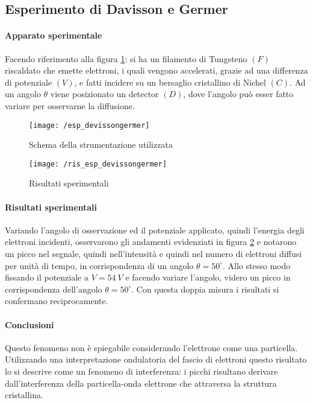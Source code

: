 \subsection{Esperimento di Davisson e Germer}
\paragraph{Apparato sperimentale} 
Facendo riferimento alla figura \ref{app_spe}: si ha un filamento di Tungsteno $(F)$ riscaldato che emette elettroni, i quali vengono accelerati, grazie ad una differenza di potenziale $(V)$, e fatti incidere su un bersaglio cristallino di Nichel $(C)$.
Ad un angolo $\theta$ viene posizionato un detector $(D)$, dove l'angolo può esser fatto variare per osservarne la diffusione.

\begin{figure}[h]
\centering
\texttt{[image: /esp\_devissongermer]}
\caption{Schema della strumentazione utilizzata}
\label{app_spe}
\end{figure}
\begin{figure}[h]
\centering
\texttt{[image: /ris\_esp\_devissongermer]}
\caption{Risultati sperimentali}
\label{res_spe}
\end{figure}

\paragraph{Risultati sperimentali}
Variando l'angolo di osservazione ed il potenziale applicato, quindi l'energia degli elettroni incidenti, osservarono gli andamenti evidenziati in figura \ref{res_spe} e notarono un picco nel segnale, quindi nell'intensità e quindi nel numero di elettroni diffusi per unità di tempo, in corrispondenza di un angolo $\theta = 50^{\circ}$.
Allo stesso modo fissando il potenziale a $V = \SI{54}{V}$ e facendo variare l'angolo, videro un picco in corrispondenza dell'angolo $\theta = 50^{\circ}$.
Con questa doppia misura i risultati si confermano reciprocamente.

\paragraph{Conclusioni}
Questo fenomeno non è spiegabile considerando l'elettrone come una particella.
Utilizzando una interpretazione ondulatoria del fascio di elettroni questo risultato lo si descrive come un fenomeno di interferenza:
i picchi risultano derivare dall'interferenza della particella-onda elettrone che attraversa la struttura cristallina.

